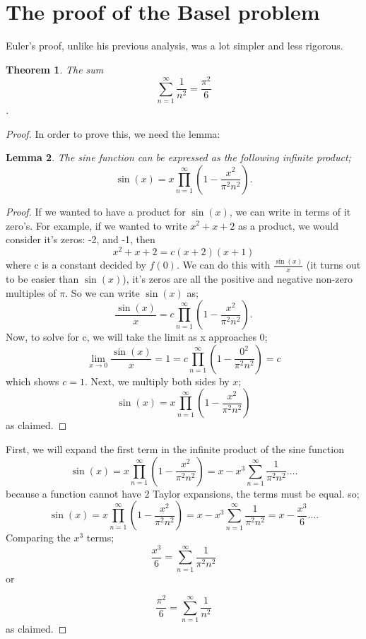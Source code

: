 \documentclass{article}
\newtheorem{theorem}{Theorem}[section]
\newtheorem{lemma}[theorem]{Lemma}
\theoremstyle{remark}
\theoremstyle{definition}
\begin{document}
\section{The proof of the Basel problem}
Euler's proof, unlike his previous analysis, was a lot simpler and less rigorous.
\begin{theorem}
The sum
\[\sum_{n=1}^{\infty}\frac{1}{n^2}=\frac{\pi^2}{6}\].

\end{theorem}
\begin{proof}
In order to prove this, we need the lemma:
\begin{lemma}
The sine function can be expressed as the following infinite product;
\[\sin(x)=x\prod_{n=1}^{\infty}(1-\frac{x^2}{\pi^2n^2}).
\]
\end{lemma}
\begin{proof}
If we wanted to have a product for $\sin(x)$, we can write in terms of it zero's. For example, if we wanted to write $x^2+x+2$ as a product, we would consider it's zeros: -2, and -1, then
\[x^2+x+2=c(x+2)(x+1)\]
where c is a constant decided by $f(0)$. We can do this with $\frac{\sin(x)}{x}$ (it turns out to be easier than $\sin(x)$), it's zeros are all the positive and negative non-zero multiples of $\pi$. So we can write $\sin(x)$ as;
    \[\frac{\sin(x)}{x}=c\prod_{n=1}^{\infty}(1-\frac{x^2}{\pi^2n^2}).\]
Now, to solve for c, we will take the limit as x approaches 0;
\[\lim_{x\rightarrow 0}{\frac{\sin(x)}{x}}=1=c\prod_{n=1}^{\infty}(1-\frac{0^2}{\pi^2n^2})=c\]
which shows $c=1$. Next, we multiply both sides by $x$;
\[\sin(x)=x\prod_{n=1}^{\infty}(1-\frac{x^2}{\pi^2n^2})\]
as claimed.
\end{proof}
First, we will expand the first term in the infinite product of the sine function
\begin{equation}
    \sin(x)=x\prod_{n=1}^{\infty}(1-\frac{x^2}{\pi^2n^2})=x-x^3\sum_{n=1}^{\infty}\frac{1}{\pi^2n^2}….
\end{equation}
because a function cannot have 2 Taylor expansions, the terms must be equal. so;
\[\sin(x)=x\prod_{n=1}^{\infty}(1-\frac{x^2}{\pi^2n^2})=x-x^3\sum_{n=1}^{\infty}\frac{1}{\pi^2n^2}=x-\frac{x^3}{6}….\]
Comparing the $x^3$ terms;
\[\frac{x^3}{6}=\sum_{n=1}^{\infty}\frac{1}{\pi^2n^2}\]
or

\[\frac{\pi^2}{6}=\sum_{n=1}^{\infty}\frac{1}{n^2}\]
as claimed.
\end{proof}
\end{document}
